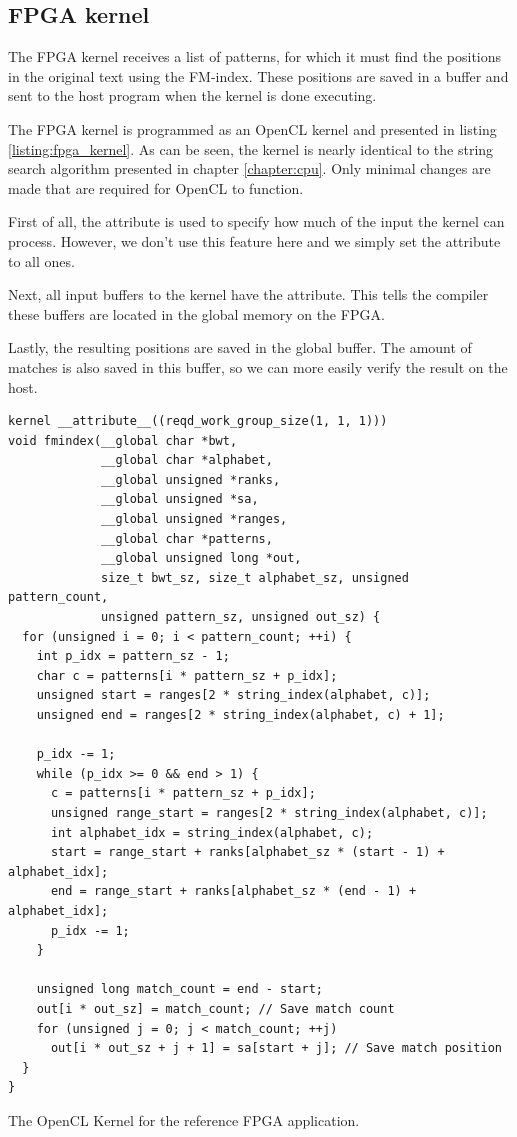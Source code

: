 \subsection{FPGA kernel} \label{section:fpga_kernel}

The FPGA kernel receives a list of patterns, for which it must find the positions in the original text using the FM-index.
These positions are saved in a buffer and sent to the host program when the kernel is done executing.

The FPGA kernel is programmed as an OpenCL kernel and presented in listing \ref{listing:fpga_kernel}.
As can be seen, the kernel is nearly identical to the string search algorithm presented in chapter \ref{chapter:cpu}.
Only minimal changes are made that are required for OpenCL to function.

First of all, the  attribute is used to specify how much of the input the kernel can process.
However, we don't use this feature here and we simply set the attribute to all ones.

Next, all input buffers to the kernel have the  attribute.
This tells the compiler these buffers are located in the global memory on the FPGA.

Lastly, the resulting positions are saved in the global  buffer.
The amount of matches is also saved in this buffer, so we can more easily verify the result on the host.

\begin{listing}[H]
\begin{verbatim}
kernel __attribute__((reqd_work_group_size(1, 1, 1)))
void fmindex(__global char *bwt,
             __global char *alphabet,
             __global unsigned *ranks,
             __global unsigned *sa,
             __global unsigned *ranges,
             __global char *patterns,
             __global unsigned long *out,
             size_t bwt_sz, size_t alphabet_sz, unsigned pattern_count,
             unsigned pattern_sz, unsigned out_sz) {
  for (unsigned i = 0; i < pattern_count; ++i) {
    int p_idx = pattern_sz - 1;
    char c = patterns[i * pattern_sz + p_idx];
    unsigned start = ranges[2 * string_index(alphabet, c)];
    unsigned end = ranges[2 * string_index(alphabet, c) + 1];

    p_idx -= 1;
    while (p_idx >= 0 && end > 1) {
      c = patterns[i * pattern_sz + p_idx];
      unsigned range_start = ranges[2 * string_index(alphabet, c)];
      int alphabet_idx = string_index(alphabet, c);
      start = range_start + ranks[alphabet_sz * (start - 1) + alphabet_idx];
      end = range_start + ranks[alphabet_sz * (end - 1) + alphabet_idx];
      p_idx -= 1;
    }

    unsigned long match_count = end - start;
    out[i * out_sz] = match_count; // Save match count
    for (unsigned j = 0; j < match_count; ++j)
      out[i * out_sz + j + 1] = sa[start + j]; // Save match position
  }
}
\end{verbatim}
\caption{The OpenCL Kernel for the reference FPGA application.}
\label{listing:fpga_kernel}
\end{listing}

